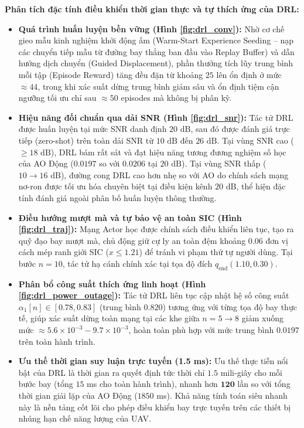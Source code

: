 \vspace{0.1cm}
\textbf{Phân tích đặc tính điều khiển thời gian thực và tự thích ứng của DRL:}
\begin{itemize}[leftmargin=1.5em]
    \item \textbf{Quá trình huấn luyện bền vững (Hình \ref{fig:drl_conv}):} Nhờ cơ chế gieo mẫu kinh nghiệm khởi động ấm (Warm-Start Experience Seeding -- nạp các chuyển tiếp mẫu từ đường bay thẳng ban đầu vào Replay Buffer) và dẫn hướng dịch chuyển (Guided Displacement), phần thưởng tích lũy trung bình mỗi tập (Episode Reward) tăng đều đặn từ khoảng $25$ lên ổn định ở mức $\approx 44$, trong khi xác suất dừng trung bình giảm sâu và ổn định tiệm cận ngưỡng tối ưu chỉ sau $\approx 50$ episodes mà không bị phân kỳ.
    \item \textbf{Hiệu năng đối chuẩn qua dải SNR (Hình \ref{fig:drl_snr}):} Tác tử DRL được huấn luyện tại mức SNR danh định $20\text{ dB}$, sau đó được đánh giá trực tiếp (zero-shot) trên toàn dải SNR từ $10\text{ dB}$ đến $26\text{ dB}$. Tại vùng SNR cao ($\ge 18\text{ dB}$), DRL bám rất sát và đạt hiệu năng tương đương nghiệm số học của AO Động ($0.0197$ so với $0.0206$ tại $20\text{ dB}$). Tại vùng SNR thấp ($10 \to 16\text{ dB}$), đường cong DRL cao hơn nhẹ so với AO do chính sách mạng nơ-ron được tối ưu hóa chuyên biệt tại điều kiện kênh $20\text{ dB}$, thể hiện đặc tính đánh giá ngoài phân bố huấn luyện thông thường.
    \item \textbf{Điều hướng mượt mà và tự bảo vệ an toàn SIC (Hình \ref{fig:drl_traj}):} Mạng Actor học được chính sách điều khiển liên tục, tạo ra quỹ đạo bay mượt mà, chủ động giữ cự ly an toàn đệm khoảng $0.06$ đơn vị cách mép ranh giới SIC ($x \le 1.21$) để tránh vi phạm thứ tự người dùng. Tại bước $n=10$, tác tử hạ cánh chính xác tại tọa độ đích $q_{\text{end}}(1.10, 0.30)$.
    \item \textbf{Phân bổ công suất thích ứng linh hoạt (Hình \ref{fig:drl_power_outage}):} Tác tử DRL liên tục cập nhật hệ số công suất $\alpha_1[n] \in [0.78, 0.83]$ (trung bình $0.820$) tương ứng với từng tọa độ bay thực tế, giúp xác suất dừng toàn mạng tại các khe giữa $n = 5 \to 8$ giảm xuống mức $\approx 5.6 \times 10^{-3} - 9.7 \times 10^{-3}$, hoàn toàn phù hợp với mức trung bình $0.0197$ trên toàn hành trình.
    \item \textbf{Ưu thế thời gian suy luận trực tuyến (1.5 ms):} Ưu thế thực tiễn nổi bật của DRL là thời gian ra quyết định tức thời chỉ $\mathbf{1.5}$ mili-giây cho mỗi bước bay (tổng $15$ ms cho toàn hành trình), nhanh hơn $\mathbf{120}$ lần so với tổng thời gian giải lặp của AO Động ($1850$ ms). Khả năng tính toán siêu nhanh này là nền tảng cốt lõi cho phép điều khiển bay trực tuyến trên các thiết bị nhúng hạn chế năng lượng của UAV.
\end{itemize}
